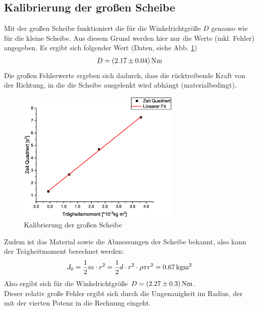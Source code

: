 \subsection{Kalibrierung der großen Scheibe}
Mit der großen Scheibe funktioniert die für die Winkelrichtgröße $D$ genauso wie für die kleine Scheibe. Aus diesem Grund werden hier nur die Werte (inkl. Fehler) angegeben. Es ergibt sich folgender Wert (Daten, siehe Abb. \ref{fig:kal2})
\begin{align*}
D = \unit[(2.17 \pm 0.04)]{N m}
\end{align*}
Die großen Fehlerwerte ergeben sich dadurch, dass die rücktreibende Kraft von der Richtung, in die die Scheibe ausgelenkt wird abhängt (materialbedingt).
\begin{figure}
\begin{center}
\includegraphics[width=0.7\textwidth]{Bilder/kal2.eps}
\caption{Kalibrierung der großen Scheibe}
\label{fig:kal2}
\end{center}
\end{figure}
Zudem ist das Material sowie die Abmessungen der Scheibe bekannt, also kann der Trägheitmoment berechnet werden:
\begin{equation}
J_0 = \frac{1}{2} m \cdot r^2 = \frac{1}{2} d\cdot r^2 \cdot \rho \pi r^2 = \unit[0.67]{kg m^2}
\end{equation}
Also ergibt sich für die Winkelrichtgröße $D = \unit[(2.27 \pm 0.3)]{N m}$.\\
Dieser relativ große Fehler ergibt sich durch die Ungenauigkeit im Radius, der mit der vierten Potenz in die Rechnung eingeht.







